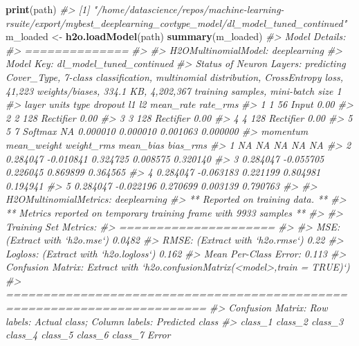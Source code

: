 \documentclass[]{book}
\newenvironment{Shaded}{\begin{snugshade}}{\end{snugshade}}
\newcommand{\CommentTok}[1]{\textcolor[rgb]{0.56,0.35,0.01}{\textit{#1}}}
\newcommand{\KeywordTok}[1]{\textcolor[rgb]{0.13,0.29,0.53}{\textbf{#1}}}
\newcommand{\NormalTok}[1]{#1}
\newcommand{\StringTok}[1]{\textcolor[rgb]{0.31,0.60,0.02}{#1}}
\begin{document}
\begin{Shaded}
\begin{Highlighting}[]
\KeywordTok{print}\NormalTok{(path)}
\CommentTok{#> [1] "/home/datascience/repos/machine-learning-rsuite/export/mybest_deeplearning_covtype_model/dl_model_tuned_continued"}
\NormalTok{m_loaded <-}\StringTok{ }\KeywordTok{h2o.loadModel}\NormalTok{(path)}
\KeywordTok{summary}\NormalTok{(m_loaded)}
\CommentTok{#> Model Details:}
\CommentTok{#> ==============}
\CommentTok{#> }
\CommentTok{#> H2OMultinomialModel: deeplearning}
\CommentTok{#> Model Key:  dl_model_tuned_continued }
\CommentTok{#> Status of Neuron Layers: predicting Cover_Type, 7-class classification, multinomial distribution, CrossEntropy loss, 41,223 weights/biases, 334.1 KB, 4,202,367 training samples, mini-batch size 1}
\CommentTok{#>   layer units      type dropout       l1       l2 mean_rate rate_rms}
\CommentTok{#> 1     1    56     Input  0.00 %       NA       NA        NA       NA}
\CommentTok{#> 2     2   128 Rectifier  0.00 % 0.000010 0.000010  0.001063 0.000000}
\CommentTok{#> 3     3   128 Rectifier  0.00 % 0.000010 0.000010  0.001063 0.000000}
\CommentTok{#> 4     4   128 Rectifier  0.00 % 0.000010 0.000010  0.001063 0.000000}
\CommentTok{#> 5     5     7   Softmax      NA 0.000010 0.000010  0.001063 0.000000}
\CommentTok{#>   momentum mean_weight weight_rms mean_bias bias_rms}
\CommentTok{#> 1       NA          NA         NA        NA       NA}
\CommentTok{#> 2 0.284047   -0.010841   0.324725  0.008575 0.320140}
\CommentTok{#> 3 0.284047   -0.055705   0.226045  0.869899 0.364565}
\CommentTok{#> 4 0.284047   -0.063183   0.221199  0.804981 0.194941}
\CommentTok{#> 5 0.284047   -0.022196   0.270699  0.003139 0.790763}
\CommentTok{#> }
\CommentTok{#> H2OMultinomialMetrics: deeplearning}
\CommentTok{#> ** Reported on training data. **}
\CommentTok{#> ** Metrics reported on temporary training frame with 9933 samples **}
\CommentTok{#> }
\CommentTok{#> Training Set Metrics: }
\CommentTok{#> =====================}
\CommentTok{#> }
\CommentTok{#> MSE: (Extract with `h2o.mse`) 0.0482}
\CommentTok{#> RMSE: (Extract with `h2o.rmse`) 0.22}
\CommentTok{#> Logloss: (Extract with `h2o.logloss`) 0.162}
\CommentTok{#> Mean Per-Class Error: 0.113}
\CommentTok{#> Confusion Matrix: Extract with `h2o.confusionMatrix(<model>,train = TRUE)`)}
\CommentTok{#> =========================================================================}
\CommentTok{#> Confusion Matrix: Row labels: Actual class; Column labels: Predicted class}
\CommentTok{#>         class_1 class_2 class_3 class_4 class_5 class_6 class_7  Error}
}}}}
\end{Highlighting}
\end{Shaded}
\end{document}
